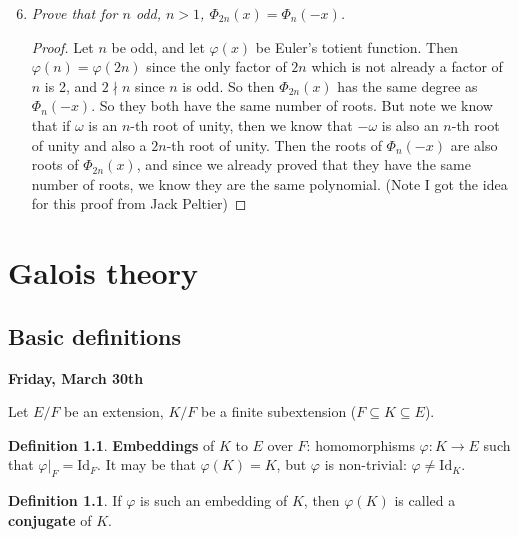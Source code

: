\documentclass[9pt,reqno,twoside]{amsbook}
\theoremstyle{plain}
\numberwithin{section}{chapter}
\numberwithin{equation}{chapter}
\theoremstyle{definition}
\newtheorem{Def}[theorem]{Definition}
\theoremstyle{remark}
\theoremstyle{plain}
\newcommand{\sub}{\subseteq}
\renewcommand{\phi}{\varphi}
\begin{document}
\begin{enumerate}[label=\arabic*.]
\setcounter{enumi}{5}
\item \textit{Prove that for $n$ odd, $n> 1$, $\Phi_{2n}(x) = \Phi_n(-x)$. }

\begin{proof}
Let $n$ be odd, and let $\phi(x)$ be Euler's totient function. Then $\phi(n) = \phi(2n)$ since the only factor of $2n$ which is not already a factor of $n$ is 2, and $2\nmid n$ since $n$ is odd. So then $\Phi_{2n}(x)$ has the same degree as $\Phi_n(-x)$. So they both have the same number of roots. But note we know that if $\omega$ is an $n$-th root of unity, then we know that $-\omega$ is also an $n$-th root of unity and also a $2n$-th root of unity. Then the roots of $\Phi_{n}(-x)$ are also roots of $\Phi_{2n}(x)$, and since we already proved that they have the same number of roots, we know they are the same polynomial. (Note I got the idea for this proof from Jack Peltier)
\end{proof}

\end{enumerate}














\chapter{Galois theory}

\section{Basic definitions}

\textbf{Friday, March 30th}

Let $E/F$ be an extension, $K/F$ be a finite subextension ($F\sub K \sub E$). 

\begin{Def}
\textbf{Embeddings} of $K$ to $E$ over $F$:
homomorphisms $\phi:K \to E$ such that $\phi|_F = \text{Id}_F$. It may be that $\phi(K) = K$, but $\phi$ is non-trivial: $\phi \neq \text{Id}_K$. 
\end{Def}

\begin{Def}
If $\phi$ is such an embedding of $K$, then $\phi(K)$ is called a \textbf{conjugate} of $K$. 
\end{Def}
\end{document}
